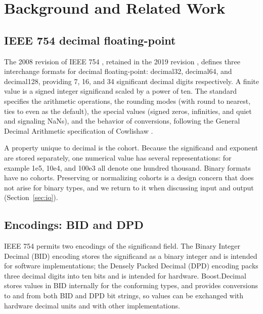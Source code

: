 \documentclass[acmsmall]{acmart}
\begin{document}
\section{Background and Related Work}
\label{sec:background}

\subsection{IEEE 754 decimal floating-point}
The 2008 revision of IEEE 754 \cite{IEEE754-2008}, retained in the 2019 revision
\cite{IEEE754-2019}, defines three interchange formats for decimal floating-point:
decimal32, decimal64, and decimal128, providing 7, 16, and 34 significant decimal
digits respectively. A finite value is a signed integer significand scaled by a
power of ten. The standard specifies the arithmetic operations, the rounding modes
(with round to nearest, ties to even as the default), the special values (signed
zeros, infinities, and quiet and signaling NaNs), and the behavior of conversions,
following the General Decimal Arithmetic specification of Cowlishaw
\cite{Cowlishaw2003}.

A property unique to decimal is the cohort. Because the significand and exponent are
stored separately, one numerical value has several representations: for example 1e5,
10e4, and 100e3 all denote one hundred thousand. Binary formats have no cohorts.
Preserving or normalizing cohorts is a design concern that does not arise for binary
types, and we return to it when discussing input and output (Section~\ref{sec:io}).

\subsection{Encodings: BID and DPD}
IEEE 754 permits two encodings of the significand field. The Binary Integer Decimal
(BID) encoding stores the significand as a binary integer and is intended for
software implementations; the Densely Packed Decimal (DPD) encoding packs three
decimal digits into ten bits and is intended for hardware. Boost.Decimal stores
values in BID internally for the conforming types, and provides conversions to and
from both BID and DPD bit strings, so values can be exchanged with hardware decimal
units and with other implementations.
\end{document}
